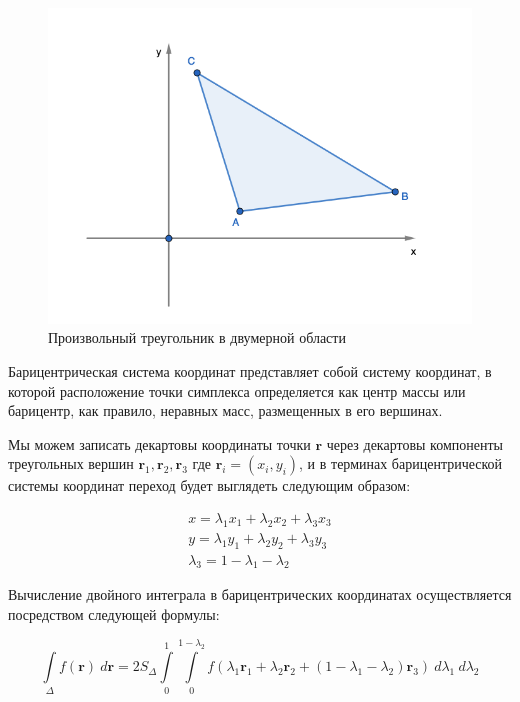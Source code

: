 \documentclass[14pt]{extreport}
\begin{document}
\begin{figure}[H]
\centerline{
\includegraphics[width=0.8\linewidth]{images/triangle}}
\caption{Произвольный треугольник в двумерной области}
\label{img:integrate:triangle}
\end{figure}

Барицентрическая система координат представляет собой систему координат, в которой расположение точки симплекса определяется как центр массы или барицентр, как правило, неравных масс, размещенных в его вершинах. 

Мы можем записать декартовы координаты точки $\mathbf{r}$ через декартовы компоненты треугольных вершин $\mathbf{r}_1, \mathbf{r}_2, \mathbf{r}_3$ где $\mathbf{r}_i = (x_i, y_i)$, и в терминах барицентрической системы координат переход будет выглядеть следующим образом:

\begin{eqnarray}
x = \lambda_{1} x_{1} +  \lambda_{2} x_{2} +  \lambda_{3} x_{3} \\
y = \lambda_{1} y_{1} +  \lambda_{2} y_{2} +  \lambda_{3} y_{3} \\
\lambda_{3} = 1 - \lambda_{1} - \lambda_{2}
\end{eqnarray}

Вычисление двойного интеграла в барицентрических координатах осуществляется посредством следующей формулы\cite{bib:calc:barycentric}:

\begin{equation}
\int\limits_{\Delta} f(\mathbf{r}) \ d\mathbf{r} = 2S_{\Delta} \int\limits_{0}^{1} \int\limits_{0}^{1 - \lambda_{2}} f(\lambda_{1} \mathbf{r}_{1} + \lambda_{2} \mathbf{r}_{2} +
(1 - \lambda_{1} - \lambda_{2}) \mathbf{r}_{3}) \ d\lambda_{1} \ d\lambda_{2}
\end{equation}
\end{document}
